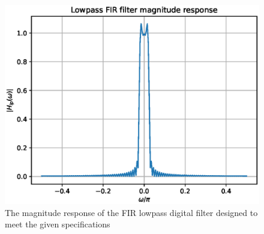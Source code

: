 \documentclass{article}
\begin{document}
\begin{figure}
\label{fig6}
\includegraphics[width = 15cm]{./codes/fir/figs/ee18btech11012_FIR_Lowpass.eps}
\caption{The magnitude response of the FIR lowpass digital filter designed to meet the given specifications} 
\end{figure}
\end{document}
